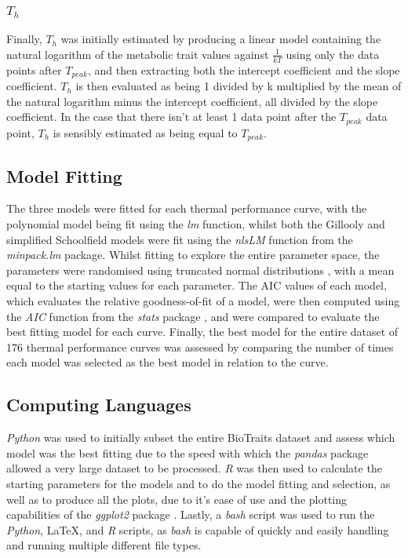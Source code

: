 \documentclass[11pt]{article}
\begin{document}
\begin{linenumbers}
\subsubsection{$T_{h}$}
Finally, $T_{h}$ was initially estimated by producing a linear model containing the natural logarithm of the metabolic trait values against $\tfrac{1}{kT}$ using only the data points after $T_{peak}$, and then extracting both the intercept coefficient and the slope coefficient. $T_{h}$ is then evaluated as being 1 divided by k multiplied by the mean of the natural logarithm minus the intercept coefficient, all divided by the slope coefficient. In the case that there isn't at least 1 data point after the $T_{peak}$ data point, $T_{h}$ is sensibly estimated as being equal to $T_{peak}$.
\subsection{Model Fitting}
The three models were fitted for each thermal performance curve, with the polynomial model being fit using the \textit{lm} function, whilst both the Gillooly and simplified Schoolfield models were fit using the \textit{nlsLM} function from the \textit{minpack.lm} \citep{Elzhov2016} package. Whilst fitting to explore the entire parameter space, the parameters were randomised using truncated normal distributions \citep{Mersmann2018}, with a mean equal to the starting values for each parameter. The AIC values of each model, which evaluates the relative goodness-of-fit of a model, were then computed using the \textit{AIC} function from the \textit{stats} package \citep{R2018}, and were compared to evaluate the best fitting model for each curve. Finally, the best model for the entire dataset of 176 thermal performance curves was assessed by comparing the number of times each model was selected as the best model in relation to the curve.
\subsection{Computing Languages}
\textit{Python} \citep{Python2018} was used to initially subset the entire BioTraits dataset and assess which model was the best fitting due to the speed with which the \textit{pandas} package \citep{Scipy2010} allowed a very large dataset to be processed. \textit{R} \citep{R2018} was then used to calculate the starting parameters for the models and to do the model fitting and selection, as well as to produce all the plots, due to it's ease of use and the plotting capabilities of the \textit{ggplot2} package \citep{Wickham2016}. Lastly, a \textit{bash} script was used to run the \textit{Python}, \LaTeX, and \textit{R} scripts, as \textit{bash} is capable of quickly and easily handling and running multiple different file types.


\end{linenumbers}
\end{document}
